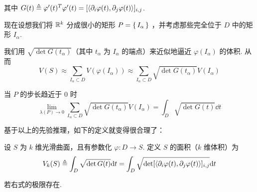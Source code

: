 其中 $G(t)\triangleq\varphi'(t)^T\varphi'(t)=[\left\langle{\partial_i\varphi(t),\partial_j\varphi(t)}\right\rangle]_{i,j}$.

现在设想我们将 $\mathbb{R}^k$ 分成很小的矩形 $P=\set{I_\alpha}$ ，并考虑那些完全位于 $D$ 中的矩形 $I_\alpha$.

我们用 $\sqrt{\det G(t_\alpha)}$（其中 $t_\alpha$ 为 $I_\alpha$ 的端点）来近似地逼近 $\varphi(I_\alpha)$ 的体积. 从而
$$
V(S)\approx\sum_{I_\alpha\subset D}V(\varphi(I_\alpha))\approx\sum_{I_\alpha\subset D}\sqrt{\det G(t_\alpha)}V(I_\alpha)
$$

当 $P$ 的步长趋近于 $0$ 时
$$
\lim_{\lambda(P)\to 0}\sum_{I_\alpha\subset D}\sqrt{\det G(t_\alpha)}V(I_\alpha)=\int_D\sqrt{\det G(t)}\dd t
$$

基于以上的先验推理，如下的定义就变得很合理了：

\begin{definition}\label{df:area}
    设 $S$ 为 $k$ 维光滑曲面，且有参数化 $\varphi:D\to S$. 定义 $S$ 的面积（$k$ 维体积）为
$$
V_k(S)\triangleq\int_D\sqrt{\det G(t)}\mathrm{d} t=\int_D\sqrt{\det[\left\langle{\partial_i\varphi(t),\partial_j\varphi(t)}\right\rangle]_{i,j}}\mathrm{d} t
$$

    若右式的极限存在.
\end{definition}

